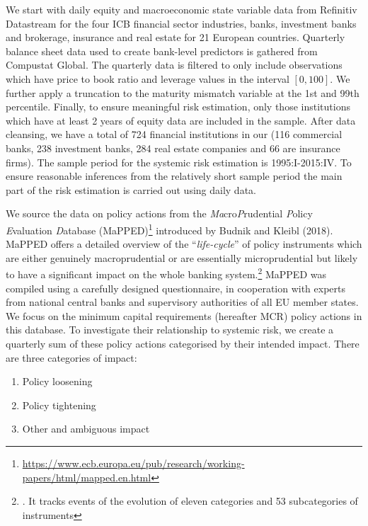 \documentclass[
  10pt,
]{article}
\providecommand{\tightlist}{%
  \setlength{\itemsep}{0pt}\setlength{\parskip}{0pt}}
\begin{document}
We start with daily equity and macroeconomic state variable data from
Refinitiv Datastream for the four ICB financial sector industries,
banks, investment banks and brokerage, insurance and real estate for 21
European countries. Quarterly balance sheet data used to create
bank-level predictors is gathered from Compustat Global. The quarterly
data is filtered to only include observations which have price to book
ratio and leverage values in the interval \([0,100]\). We further apply
a truncation to the maturity mismatch variable at the 1st and 99th
percentile. Finally, to ensure meaningful risk estimation, only those
institutions which have at least 2 years of equity data are included in
the sample. After data cleansing, we have a total of 724 financial
institutions in our (116 commercial banks, 238 investment banks, 284
real estate companies and 66 are insurance firms). The sample period for
the systemic risk estimation is 1995:I-2015:IV. To ensure reasonable
inferences from the relatively short sample period the main part of the
risk estimation is carried out using daily data.

We source the data on policy actions from the
\emph{Ma}cro\emph{P}rudential \emph{P}olicy \emph{E}valuation
\emph{D}atabase (MaPPED)\footnote{\url{https://www.ecb.europa.eu/pub/research/working-papers/html/mapped.en.html}}
introduced by Budnik and Kleibl (2018). MaPPED offers a detailed
overview of the ``\emph{life-cycle}'' of policy instruments which are
either genuinely macroprudential or are essentially microprudential but
likely to have a significant impact on the whole banking
system.\footnote{. It tracks events of the evolution of eleven
  categories and 53 subcategories of instruments} MaPPED was compiled
using a carefully designed questionnaire, in cooperation with experts
from national central banks and supervisory authorities of all EU member
states. We focus on the minimum capital requirements (hereafter MCR)
policy actions in this database. To investigate their relationship to
systemic risk, we create a quarterly sum of these policy actions
categorised by their intended impact. There are three categories of
impact:

\begin{enumerate}
\def\labelenumi{\arabic{enumi}.}
\tightlist
\item
  Policy loosening
\item
  Policy tightening
\item
  Other and ambiguous impact
\end{enumerate}
\end{document}
